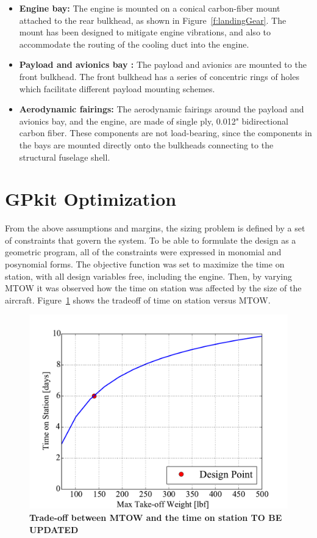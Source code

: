 \documentclass[journal]{aiaa-tc}%
\begin{document}
\begin{itemize}
\begin{itemize}
    \item \textbf{Engine bay: } 
    The engine is mounted on a conical carbon-fiber mount attached to the rear bulkhead, as shown in Figure~\ref{f:landingGear}. The mount has been designed to mitigate engine vibrations, and also to accommodate the routing of the cooling duct into the engine.
    
    \item \textbf{Payload and avionics bay :} 
    The payload and avionics are mounted to the front bulkhead. The front bulkhead has a series of concentric rings of holes which facilitate different payload mounting schemes.
     
    \item \textbf{Aerodynamic fairings: } 
    The aerodynamic fairings around the payload and avionics bay, and the engine, are made of single ply, 0.012" bidirectional carbon fiber. These components are not load-bearing, since the components in the bays are mounted directly onto the bulkheads connecting to the structural fuselage shell. 
\end{itemize}
\end{itemize}

\section{GPkit Optimization}
\label{GPkit}

    From the above assumptions and margins, the sizing problem is defined by a set of constraints that govern the system. To be able to formulate the design as a geometric program, all of the constraints were expressed in monomial and posynomial forms. The objective function was set to maximize the time on station, with all design variables free, including the engine.  Then, by varying MTOW it was observed how the time on station was affected by the size of the aircraft.  Figure~\ref{f:tvsmtow} shows the tradeoff of time on station versus MTOW. 

\begin{figure}[h!]
    \begin{center}
    \includegraphics[width = .55\textwidth]{tvsmtow}
     \caption{ \textbf{Trade-off between MTOW and the time on station TO BE UPDATED} }
    \label{f:tvsmtow}
    \end{center}
\end{figure}
\end{document}
